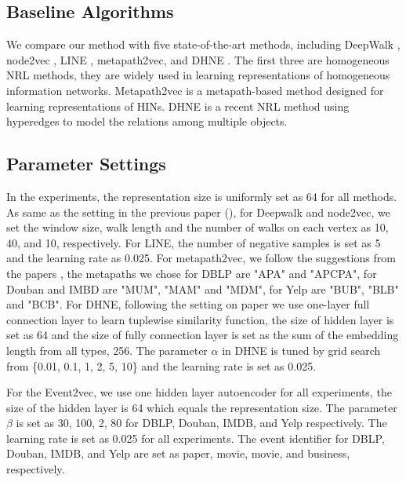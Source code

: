 \subsection{Baseline Algorithms}
We compare our method with five state-of-the-art methods, including DeepWalk \cite{perozzi2014deepwalk}, node2vec \cite{grover2016node2vec}, LINE \cite{tang2015line}, metapath2vec\cite{dong2017metapath2vec}, and DHNE \cite{tu2017structural}. The first three are homogeneous NRL methods, they are widely used in learning representations of homogeneous information networks. Metapath2vec is a metapath-based method designed for learning representations of HINs. DHNE is a recent NRL method using hyperedges to model the relations among multiple objects.

\subsection{Parameter Settings}
In the experiments, the representation size is uniformly set as 64 for all methods. As same as the setting in the previous paper (\cite{tu2017structural}), for Deepwalk and node2vec, we set the window size, walk length and the number of walks on each vertex as 10, 40, and 10, respectively. For LINE, the number of negative samples is set as 5 and the learning rate as 0.025. For metapath2vec, we follow the suggestions from the papers \cite{dong2017metapath2vec,zheng2017recommendation}, the metapaths we chose for DBLP are "APA" and "APCPA", for Douban and IMBD are "MUM", "MAM" and "MDM", for Yelp are "BUB", "BLB" and "BCB". For DHNE, following the setting on paper \cite{tu2017structural} we use one-layer full connection layer to learn tuplewise similarity function, the size of hidden layer is set as 64 and the size of fully connection layer is set as the sum of the embedding length from all types, 256. The parameter $\alpha$ in DHNE is tuned by grid search from \{0.01, 0.1, 1, 2, 5, 10\} and the learning rate is set as 0.025.

For the Event2vec, we use one hidden layer autoencoder for all experiments, the size of the hidden layer is 64 which equals the representation size. The parameter $\beta$ is set as 30, 100, 2, 80 for DBLP, Douban, IMDB, and Yelp respectively. The learning rate is set as 0.025 for all experiments. The event identifier for DBLP, Douban, IMDB, and Yelp are set as paper, movie, movie, and business, respectively.

